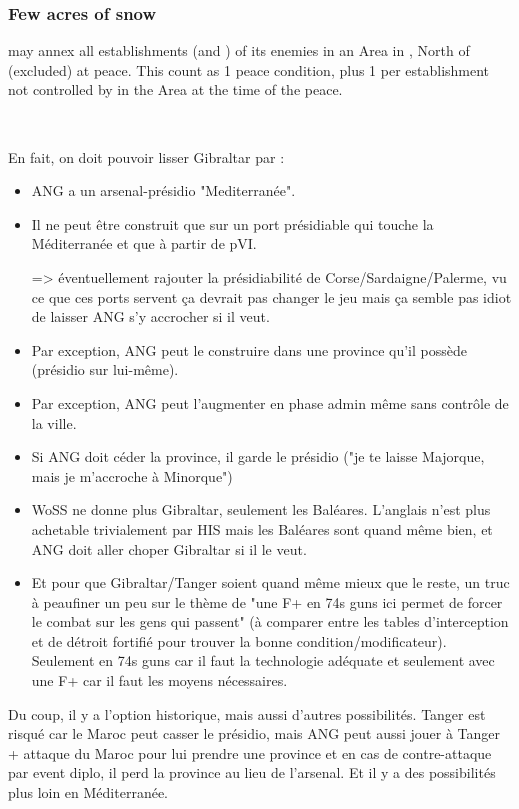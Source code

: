 \subsubsection{Few acres of snow}
\aparag \ANG may annex all establishments (\COL and \TP) of its enemies
in an Area in \continentAmerica, North of \granderegionChichimeca
(excluded) at peace.
\bparag This count as 1 peace condition, plus 1 per establishment not
controlled by \ANG in the Area at the time of the peace.

~\\

\begin{todo}
  En fait, on doit pouvoir lisser Gibraltar par :
  \begin{itemize}
  \item  ANG a un arsenal-présidio "Mediterranée".
  \item  Il ne peut être construit que sur un port présidiable qui
    touche la Méditerranée et que à partir de pVI.

    => éventuellement rajouter la présidiabilité de
    Corse/Sardaigne/Palerme, vu ce que ces ports servent ça devrait pas
    changer le jeu mais ça semble pas idiot de laisser ANG s'y accrocher
    si il veut.
  \item Par exception, ANG peut le construire dans une province qu'il
    possède (présidio sur lui-même).
  \item  Par exception, ANG peut l'augmenter en phase admin même sans
    contrôle de la ville.
  \item Si ANG doit céder la province, il garde le présidio ("je te
    laisse Majorque, mais je m'accroche à Minorque")
  \item WoSS ne donne plus Gibraltar, seulement les Baléares. L'anglais
    n'est plus achetable trivialement par HIS mais les Baléares sont
    quand même bien, et ANG doit aller choper Gibraltar si il le veut.
  \item Et pour que Gibraltar/Tanger soient quand même mieux que le
    reste, un truc à peaufiner un peu sur le thème de "une F+ en 74s
    guns ici permet de forcer le combat sur les gens qui passent" (à
    comparer entre les tables d'interception et de détroit fortifié pour
    trouver la bonne condition/modificateur). Seulement en 74s guns car
    il faut la technologie adéquate et seulement avec une F+ car il faut
    les moyens nécessaires.
  \end{itemize}

  Du coup, il y a l'option historique, mais aussi d'autres
  possibilités. Tanger est risqué car le Maroc peut casser le présidio,
  mais ANG peut aussi jouer à Tanger + attaque du Maroc pour lui prendre
  une province et en cas de contre-attaque par event diplo, il perd la
  province au lieu de l'arsenal. Et il y a des possibilités plus loin en
  Méditerranée.


\end{todo}
